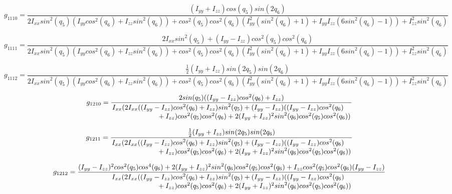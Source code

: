 \documentclass[10pt, letterpaper]{article}
\begin{document}
\[
g_{1110} = \frac{(I_{yy}+I_{zz})cos(q_{5})sin(2q_{6})}
{2I_{xx}{sin}^2(q_{5})(I_{yy}{cos}^2(q_{6})+I_{zz}{sin}^2(q_{6}))+{cos}^2(q_{5}){cos}^2(q_{6})(I_{yy}^2({sin}^2(q_{6})+1)+I_{yy}I_{zz}(6 {sin}^2(q_{6})-1))+I_{zz}^2{sin}^2(q_{6})}
\]

\[
g_{1111} = \frac{2I_{xx}{sin}^2(q_{5})+(I_{yy}-I_{zz}){cos}^2(q_{5}){cos}^2(q_{6})}
{2I_{xx}{sin}^2(q_{5})(I_{yy}{cos}^2(q_{6})+I_{zz}{sin}^2(q_{6}))+{cos}^2(q_{5}){cos}^2(q_{6})(I_{yy}^2({sin}^2(q_{6})+1)+I_{yy}I_{zz}(6 {sin}^2(q_{6})-1))+I_{zz}^2{sin}^2(q_{6})}
\]

\[
g_{1112} = \frac{\frac{1}{2}(I_{yy}+I_{zz}){sin}(2q_{5}){sin}(2q_{6})}
{2I_{xx}{sin}^2(q_{5})(I_{yy}{cos}^2(q_{6})+I_{zz}{sin}^2(q_{6}))+{cos}^2(q_{5}){cos}^2(q_{6})(I_{yy}^2({sin}^2(q_{6})+1)+I_{yy}I_{zz}(6 {sin}^2(q_{6})-1))+I_{zz}^2{sin}^2(q_{6})}
\]

\[
g_{1210} = \frac{2{sin}(q_{5})((I_{yy}-I_{zz}){cos}^2(q_{6})+I_{zz})}
{\splitfrac{I_{xx}( 2 I_{xx} ((I_{yy}-I_{zz}) {cos}^{2}(q_{6}) + I_{zz}) {sin}^{2}(q_{5}) + 
(I_{yy} - I_{zz}) ((I_{yy}-I_{zz}) {cos}^{2}(q_{6})}
{ + I_{zz}) {cos}^{2}(q_{5}) {cos}^{2}(q_{6}) + 2 (I_{yy} + I_{zz})^{2} {sin}^{2}(q_{6}) {cos}^{2}(q_{5}) {cos}^{2}(q_{6}))}}
\]

\[
g_{1211} = \frac{\frac{1}{2}(I_{yy}+I_{zz}){sin}(2q_{5}){sin}(2q_{6})}
{\splitfrac{I_{xx}( 2 I_{xx} ((I_{yy}-I_{zz}) {cos}^{2}(q_{6}) + I_{zz}) {sin}^{2}(q_{5}) + 
(I_{yy} - I_{zz}) ((I_{yy}-I_{zz}) {cos}^{2}(q_{6})}
{ + I_{zz}) {cos}^{2}(q_{5}) {cos}^{2}(q_{6}) + 2 (I_{yy} + I_{zz})^{2} {sin}^{2}(q_{6}) {cos}^{2}(q_{5}) {cos}^{2}(q_{6}))}}
\]

\[
g_{1212} = \frac{(I_{yy}-I_{zz})^2{cos}^2(q_{5}){cos}^4(q_{6}) + 2(I_{yy}+I_{zz})^2{sin}^2(q_{6}){cos}^2(q_{5}){cos}^2(q_{6})+I_{zz}{cos}^2(q_{5}){cos}^2(q_{6})(I_{yy}-I_{zz})}
{\splitfrac{I_{xx}( 2 I_{xx} ((I_{yy}-I_{zz}) {cos}^{2}(q_{6}) + I_{zz}) {sin}^{2}(q_{5}) + 
(I_{yy} - I_{zz}) ((I_{yy}-I_{zz}) {cos}^{2}(q_{6})}
{ + I_{zz}) {cos}^{2}(q_{5}) {cos}^{2}(q_{6}) + 2 (I_{yy} + I_{zz})^{2} {sin}^{2}(q_{6}) {cos}^{2}(q_{5}) {cos}^{2}(q_{6}))}}
\]
\end{document}

